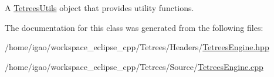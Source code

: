A \hyperlink{classTetreesUtils}{Tetrees\+Utils} object that provides utility functions. 

The documentation for this class was generated from the following files\+:\begin{DoxyCompactItemize}
\item 
/home/igao/workspace\+\_\+eclipse\+\_\+cpp/\+Tetrees/\+Headers/\hyperlink{TetreesEngine_8hpp}{Tetrees\+Engine.\+hpp}\item 
/home/igao/workspace\+\_\+eclipse\+\_\+cpp/\+Tetrees/\+Source/\hyperlink{TetreesEngine_8cpp}{Tetrees\+Engine.\+cpp}\end{DoxyCompactItemize}
